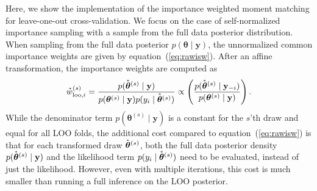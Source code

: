 \documentclass[12pt]{article}
\newcommand{\transf}{\accentset{\ast}}
\newenvironment{nalign}{
    \begin{equation}
    \begin{aligned}
}{
    \end{aligned}
    \end{equation}
    \ignorespacesafterend
}
\begin{document}
\begin{appendices}
Here, we show the implementation of the importance weighted moment matching for leave-one-out cross-validation.
We focus on the case of self-normalized importance sampling with a sample from the full data posterior
distribution.
When sampling from the full data posterior $p (\boldsymbol{\theta}\mid \mathbf{y})$, the unnormalized common importance weights are given
by equation~(\ref{eq:rawisw}).
After an affine transformation, the importance weights are computed as
\begin{nalign} \label{eq:newIR}
\transf{w}_{\text{loo},i}^{(s)} = \frac{p (\transf{\boldsymbol{\theta}}^{(s)} \mid \mathbf{y})}{p(\boldsymbol{\theta}^{(s)}\mid \mathbf{y}) p(y_{i}\mid\transf{\boldsymbol{\theta}}^{(s)})} \propto \left ( \frac{p (\transf{\boldsymbol{\theta}}^{(s)} \mid \mathbf{y}_{-i})}{p(\boldsymbol{\theta}^{(s)}\mid \mathbf{y})} \right ).
%
\end{nalign}
While the denominator term $p (\boldsymbol{\theta}^{(s)}\mid \mathbf{y})$ is a constant for the $s$'th draw and equal for all LOO folds,
the additional cost compared to equation~(\ref{eq:rawisw}) is that for each transformed draw $\transf{\boldsymbol{\theta}}^{(s)}$,
both the full data posterior density $p (\transf{\boldsymbol{\theta}}^{(s)}\mid \mathbf{y})$ and
the likelihood term $p(y_{i}\mid\transf{\boldsymbol{\theta}}^{(s)})$
need to be evaluated, instead of just the likelihood.
However, even with multiple iterations, this cost is much
smaller than running a full inference on the LOO posterior.
%
%
%
%
%
%
%









\end{appendices}
\end{document}
